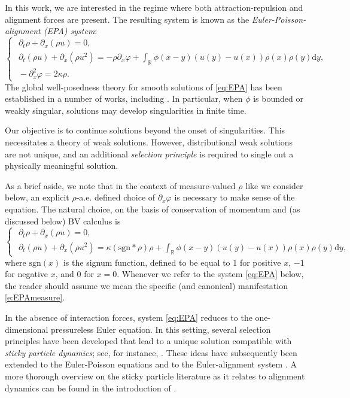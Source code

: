 \documentclass[11pt,reqno]{amsart}
\theoremstyle{definition}
\theoremstyle{remark}
\def\R{\mathbb{R}}
\def\dd{\mathrm{d}}
\def\pa{\partial}
\newcommand{\sgn}[1]{\mathrm{sgn}(#1)}
\begin{document}
	In this work, we are interested in the regime where both attraction-repulsion and alignment forces are present. The resulting system is known as the \emph{Euler-Poisson-alignment (EPA) system}:
	\begin{equation}\label{eq:EPA}
		\begin{cases}
			\,\,\pa_t \rho +\pa_x(\rho u)=0,\\
			\,\,\pa_t (\rho u) +\pa_x (\rho u^2) = -\rho\pa_x\varphi + \displaystyle \int_\R \phi(x-y)(u(y)-u(x))\rho(x)\rho(y)\dd y,\\
			\,\, -\pa_x^2\varphi = 2\kappa\rho.
		\end{cases}
	\end{equation}
	The global well-posedness theory for smooth solutions of \eqref{eq:EPA} has been established in a number of works, including \cite{carrillo2016critical,kiselev2018global,bhatnagar2020critical2,bhatnagar2023critical,choi2025critical,luan2025euler}. In particular, when $\phi$ is bounded or weakly singular, solutions may develop singularities in finite time.
	
	Our objective is to continue solutions beyond the onset of singularities. This necessitates a theory of weak solutions. However, distributional weak solutions are not unique, and an additional \emph{selection principle} is required to single out a physically meaningful solution.
	
	As a brief aside, we note that in the context of measure-valued $\rho$ like we consider below, an explicit $\rho$-a.e. defined choice of $\partial_x \varphi$ is necessary to make sense of the equation.  The natural choice, on the basis of conservation of momentum and (as discussed below) BV calculus is 
	\begin{equation} 
		\label{e:EPAmeasure}
		\begin{cases}
			\,\,\pa_t \rho +\pa_x(\rho u)=0,\\
			\,\,\pa_t (\rho u) +\pa_x (\rho u^2) = \kappa (\mathrm{sgn}*\rho)\rho + \displaystyle \int_\R \phi(x-y)(u(y)-u(x))\rho(x)\rho(y)\dd y,
		\end{cases}
	\end{equation} 
	where $\sgn{x}$ is the signum function, defined to be equal to $1$ for positive $x$, $-1$ for negative $x$, and $0$ for $x = 0$.  Whenever we refer to the system \eqref{eq:EPA} below, the reader should assume we mean the specific (and canonical) manifestation \eqref{e:EPAmeasure}.
	
	In the absence of interaction forces, system \eqref{eq:EPA} reduces to the one-dimensional pressureless Euler equation. In this setting, several selection principles have been developed that lead to a unique solution compatible with \emph{sticky particle dynamics}; see, for instance, \cite{e1996generalized,brenier1998sticky,bouchut1998one}. These ideas have subsequently been extended to the Euler-Poisson equations \cite{nguyen2008pressureless,brenier2013sticky,carrillo2023equivalence,Tudorascuetal2025} and to the Euler-alignment system \cite{leslie2023sticky,leslie2024finite,galtung2025sticky}.  A more thorough overview on the sticky particle literature as it relates to alignment dynamics can be found in the introduction of \cite{leslie2023sticky}.
	
\end{document}
